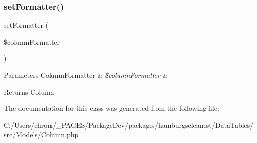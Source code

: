 \subsubsection{\texorpdfstring{set\+Formatter()}{setFormatter()}}
{\footnotesize\ttfamily set\+Formatter (\begin{DoxyParamCaption}\item[{\hyperlink{interfacehamburgscleanest_1_1_data_tables_1_1_interfaces_1_1_column_formatter}{Column\+Formatter}}]{\$column\+Formatter }\end{DoxyParamCaption})}


\begin{DoxyParams}[1]{Parameters}
Column\+Formatter & {\em \$column\+Formatter} & \\
\hline
\end{DoxyParams}
\begin{DoxyReturn}{Returns}
\hyperlink{classhamburgscleanest_1_1_data_tables_1_1_models_1_1_column}{Column} 
\end{DoxyReturn}


The documentation for this class was generated from the following file\+:\begin{DoxyCompactItemize}
\item 
C\+:/\+Users/chrom/\+\_\+\+P\+A\+G\+E\+S/\+Package\+Dev/packages/hamburgscleanest/\+Data\+Tables/src/\+Models/Column.\+php\end{DoxyCompactItemize}
